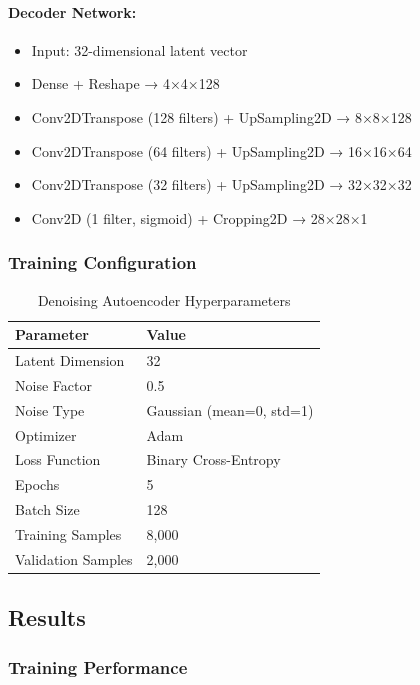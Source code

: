 \documentclass[11pt,a4paper]{article}
\begin{document}
\paragraph{Decoder Network:}
\begin{itemize}
    \item Input: 32-dimensional latent vector
    \item Dense + Reshape → 4×4×128
    \item Conv2DTranspose (128 filters) + UpSampling2D → 8×8×128
    \item Conv2DTranspose (64 filters) + UpSampling2D → 16×16×64
    \item Conv2DTranspose (32 filters) + UpSampling2D → 32×32×32
    \item Conv2D (1 filter, sigmoid) + Cropping2D → 28×28×1
\end{itemize}

\subsubsection{Training Configuration}

\begin{table}[H]
\centering
\begin{tabular}{ll}
\toprule
\textbf{Parameter} & \textbf{Value} \\
\midrule
Latent Dimension & 32 \\
Noise Factor & 0.5 \\
Noise Type & Gaussian (mean=0, std=1) \\
Optimizer & Adam \\
Loss Function & Binary Cross-Entropy \\
Epochs & 5 \\
Batch Size & 128 \\
Training Samples & 8,000 \\
Validation Samples & 2,000 \\
\bottomrule
\end{tabular}
\caption{Denoising Autoencoder Hyperparameters}
\end{table}

\subsection{Results}

\subsubsection{Training Performance}
\end{document}
